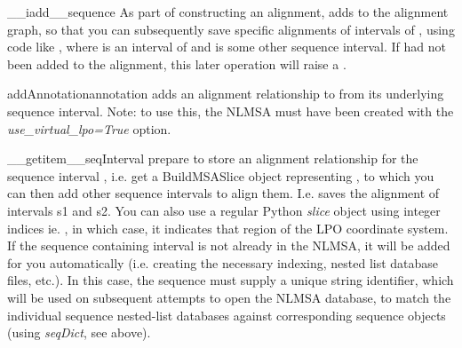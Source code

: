 \documentclass{howto}
\begin{document}
\begin{funcdesc}{__iadd__}{sequence}
  As part of constructing an alignment, adds  to the alignment graph,
  so that you can subsequently save specific alignments of intervals of
  , using code like , where  is
  an interval of  and  is some other sequence interval.
  If  had not been added to the alignment, this later operation
  will raise a .
\end{funcdesc}

\begin{funcdesc}{addAnnotation}{annotation}
  adds an alignment relationship to  from its underlying
  sequence interval.  Note: to use this, the NLMSA must have been created with the
  {\em use_virtual_lpo=True} option.
\end{funcdesc}

\begin{funcdesc}{__getitem__}{seqInterval}
  prepare to store an alignment relationship for the sequence interval ,
  i.e. get a BuildMSASlice object representing , to which you can
  then add other sequence intervals to align them.  I.e. 
  saves the alignment of intervals s1 and s2.
  You can also use a regular Python {\em slice} object using integer indices
  ie. , in which case, it indicates that 
  region of the LPO coordinate system.
  If the sequence containing
  interval  is not already in the NLMSA, it will be added for you automatically
  (i.e. creating the necessary indexing, nested list database files, etc.).  In this
  case, the sequence must supply a unique string identifier, which will be used
  on subsequent attempts to open the NLMSA database, to match the individual sequence
  nested-list databases against corresponding sequence objects (using {\em seqDict},
  see above).
\end{funcdesc}
\end{document}
